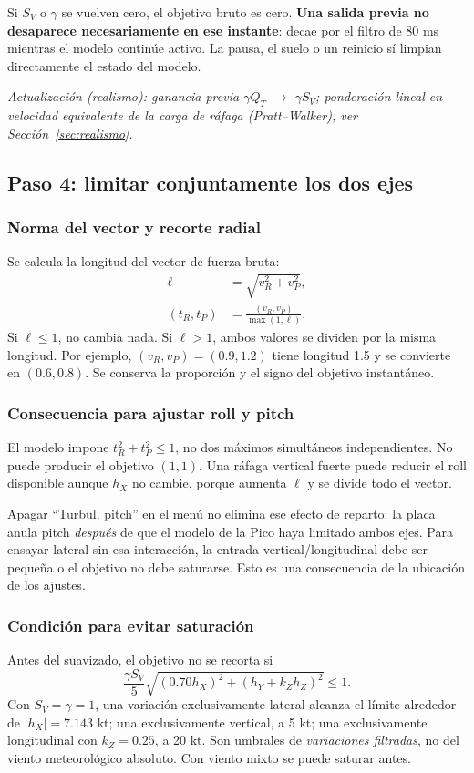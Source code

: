 \documentclass[11pt,a4paper]{article}
\begin{document}
Si $S_V$ o $\gamma$ se vuelven cero, el objetivo bruto es cero. \textbf{Una salida previa no desaparece necesariamente en ese instante}: decae por el filtro de 80 ms mientras el modelo continúe activo. La pausa, el suelo o un reinicio sí limpian directamente el estado del modelo.

\textit{Actualización (realismo): ganancia previa $\gamma Q_T$ $\rightarrow$ $\gamma S_V$; ponderación lineal en velocidad equivalente de la carga de ráfaga (Pratt--Walker); ver Sección~\ref{sec:realismo}.}

\subsection{Paso 4: limitar conjuntamente los dos ejes}
\subsubsection{Norma del vector y recorte radial}
Se calcula la longitud del vector de fuerza bruta:
\begin{align}
\ell&=\sqrt{v_R^2+v_P^2},\\
(t_R,t_P)&=\frac{(v_R,v_P)}{\max(1,\ell)}.
\label{eq:turb-limit}
\end{align}
Si $\ell\le1$, no cambia nada. Si $\ell>1$, ambos valores se dividen por la misma longitud. Por ejemplo, $(v_R,v_P)=(0.9,1.2)$ tiene longitud 1.5 y se convierte en $(0.6,0.8)$. Se conserva la proporción y el signo del objetivo instantáneo.

\subsubsection{Consecuencia para ajustar roll y pitch}
El modelo impone $t_R^2+t_P^2\le1$, no dos máximos simultáneos independientes. No puede producir el objetivo $(1,1)$. Una ráfaga vertical fuerte puede reducir el roll disponible aunque $h_X$ no cambie, porque aumenta $\ell$ y se divide todo el vector.

Apagar ``Turbul. pitch'' en el menú no elimina ese efecto de reparto: la placa anula pitch \emph{después} de que el modelo de la Pico haya limitado ambos ejes. Para ensayar lateral sin esa interacción, la entrada vertical/longitudinal debe ser pequeña o el objetivo no debe saturarse. Esto es una consecuencia de la ubicación de los ajustes.

\subsubsection{Condición para evitar saturación}
Antes del suavizado, el objetivo no se recorta si
\begin{equation}
\frac{\gamma S_V}{5}
\sqrt{(0.70h_X)^2+(h_Y+k_Zh_Z)^2}\le1.
\end{equation}
Con $S_V=\gamma=1$, una variación exclusivamente lateral alcanza el límite alrededor de $|h_X|=7.143$ kt; una exclusivamente vertical, a 5 kt; una exclusivamente longitudinal con $k_Z=0.25$, a 20 kt. Son umbrales de \emph{variaciones filtradas}, no del viento meteorológico absoluto. Con viento mixto se puede saturar antes.
\end{document}
